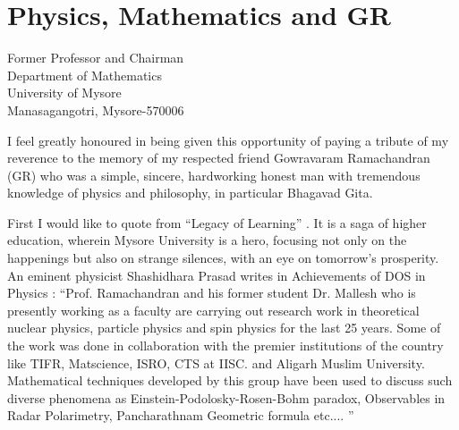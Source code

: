 \chapter[Physics, Mathematics and GR]{Physics, Mathematics and GR}\label{chap13}


\begin{center}
Former Professor and Chairman\\
Department of Mathematics\\
University of Mysore\\
Manasagangotri, Mysore-570006\\
\end{center}

I feel greatly honoured in being given this opportunity of paying a tribute of my reverence to the memory of my respected friend Gowravaram Ramachandran (GR) who was a simple, sincere, hardworking honest man with tremendous knowledge of physics and philosophy, in particular Bhagavad Gita.

First I would like to quote from “Legacy of Learning” \cite{chap13-key01BSK}. It is a saga of higher education, wherein Mysore University is a hero, focusing not only on the happenings but also on strange silences, with an eye on tomorrow's prosperity. An eminent physicist Shashidhara Prasad writes in Achievements of DOS in Physics \cite{chap13-key02BSK}: “Prof. Ramachandran and his former student Dr. Mallesh who is presently working as a faculty are carrying out research work in theoretical nuclear physics, particle physics and spin physics for the last 25 years. Some of the work was done in collaboration with the premier institutions of the country like TIFR, Matscience, ISRO, CTS at IISC. and Aligarh Muslim University. Mathematical techniques developed by this group have been used to discuss such diverse phenomena as Einstein-Podolosky-Rosen-Bohm paradox, Observables in Radar Polarimetry, Pancharathnam Geometric formula etc.... ”

